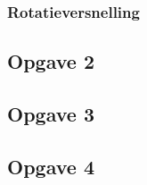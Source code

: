 \subsubsection{Rotatieversnelling}
\subsection{Opgave 2}
\subsection{Opgave 3}
\subsection{Opgave 4}